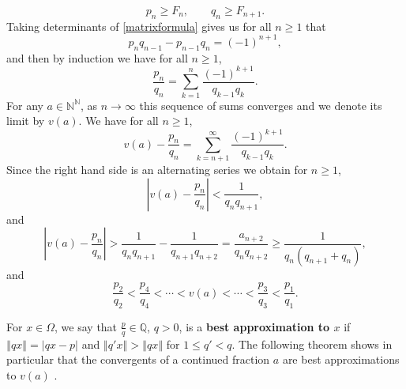 \documentclass{article}
\newcommand{\norm}[1]{\left\Vert #1 \right\Vert}
\begin{document}
\[
p_n \geq F_n,\qquad q_n \geq F_{n+1}.
\] 
Taking determinants of \eqref{matrixformula} gives us for all $n \geq 1$ that
\begin{equation}
p_nq_{n-1}-p_{n-1}q_n=(-1)^{n+1},
\label{determinants}
\end{equation}
and then by induction we have for all $n \geq 1$,
\[
\frac{p_n}{q_n}=\sum_{k=1}^n \frac{(-1)^{k+1}}{q_{k-1}q_k}.
\]
For any $a \in \mathbb{N}^\mathbb{N}$, as $n \to \infty$ this sequence of sums converges and we denote its limit by $v(a)$.
We have for all $n \geq 1$,
\[
v(a)-\frac{p_n}{q_n}=\sum_{k=n+1}^\infty  \frac{(-1)^{k+1}}{q_{k-1}q_k}.
\]
Since the right hand side is an alternating series we obtain for $n \geq 1$,
\begin{equation}
\left|  v(a)-\frac{p_n}{q_n} \right| < \frac{1}{q_n q_{n+1}},
\label{upperbound}
\end{equation}
and 
\begin{equation}
\left|  v(a)-\frac{p_n}{q_n} \right| > \frac{1}{q_nq_{n+1}}-\frac{1}{q_{n+1}q_{n+2}}=\frac{a_{n+2}}{q_n q_{n+2}} \geq \frac{1}{q_n(q_{n+1}+q_n)},
\label{lowerbound}
\end{equation}
and
\begin{equation}
\frac{p_2}{q_2}<\frac{p_4}{q_4}<\cdots<v(a)<\cdots<\frac{p_3}{q_3}<\frac{p_1}{q_1}.
\label{signs}
\end{equation}

For $x \in \Omega$, we say that $\frac{p}{q} \in \mathbb{Q}$, $q>0$, is a \textbf{best approximation to $x$}
if $\norm{qx} = |qx-p|$ and $\norm{q' x} > \norm{qx}$ for $1 \leq q'<q$.
The following theorem shows in particular that the convergents of a continued fraction $a$
are  best approximations to $v(a)$  \cite[p.~22, Chapter 2, \S 3, Theorem 1]{rockett}.
\end{document}
